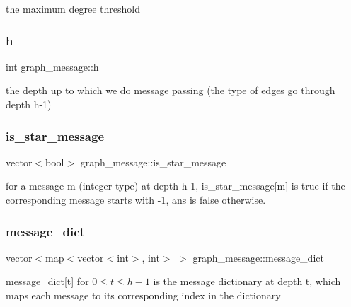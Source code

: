 the maximum degree threshold 

\mbox{\label{classgraph__message_a934d63ed7275c211e13c6fb68824ed46}} 
\subsubsection{\texorpdfstring{h}{h}}
{\footnotesize\ttfamily int graph\+\_\+message\+::h\hspace{0.3cm}{\ttfamily [private]}}



the depth up to which we do message passing (the type of edges go through depth h-\/1) 

\mbox{\label{classgraph__message_a55ff5531a0043106369e84a7bc45e22d}} 
\subsubsection{\texorpdfstring{is\+\_\+star\+\_\+message}{is\_star\_message}}
{\footnotesize\ttfamily vector$<$bool$>$ graph\+\_\+message\+::is\+\_\+star\+\_\+message}



for a message m (integer type) at depth h-\/1, is\+\_\+star\+\_\+message\mbox{[}m\mbox{]} is true if the corresponding message starts with -\/1, ans is false otherwise. 

\mbox{\label{classgraph__message_ad0a6d35ac8550fb7ff03ce90fce7d5a5}} 
\subsubsection{\texorpdfstring{message\+\_\+dict}{message\_dict}}
{\footnotesize\ttfamily vector$<$map$<$vector$<$int$>$, int$>$ $>$ graph\+\_\+message\+::message\+\_\+dict}



message\+\_\+dict\mbox{[}t\mbox{]} for $0 \leq t \leq h-1$ is the message dictionary at depth t, which maps each message to its corresponding index in the dictionary 

